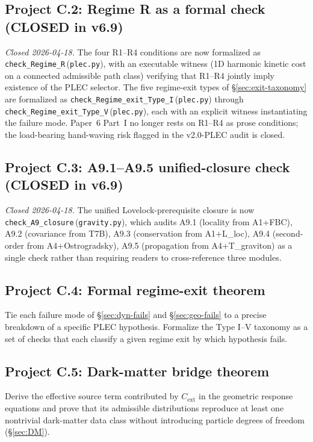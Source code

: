 \documentclass[11pt]{article}
\newcommand{\coderef}[2]{\texttt{#1}\,(\texttt{#2})}
\begin{document}
\subsection*{Project C.2: Regime R as a formal check (CLOSED in v6.9)}\label{sec:open-RegimeR}
\emph{Closed 2026-04-18.} The four R1--R4 conditions are now formalized as
\coderef{check\_Regime\_R}{plec.py}, with an executable witness (1D harmonic
kinetic cost on a connected admissible path class) verifying that R1--R4
jointly imply existence of the PLEC selector. The five regime-exit types
of \S\ref{sec:exit-taxonomy} are formalized as
\coderef{check\_Regime\_exit\_Type\_I}{plec.py} through
\coderef{check\_Regime\_exit\_Type\_V}{plec.py}, each with an explicit
witness instantiating the failure mode. Paper~6 Part~I no longer rests
on R1--R4 as prose conditions; the load-bearing hand-waving risk
flagged in the v2.0-PLEC audit is closed.

\subsection*{Project C.3: A9.1--A9.5 unified-closure check (CLOSED in v6.9)}\label{sec:open-A9}
\emph{Closed 2026-04-18.} The unified Lovelock-prerequisite closure is
now \coderef{check\_A9\_closure}{gravity.py}, which audits A9.1
(locality from A1+FBC), A9.2 (covariance from T7B), A9.3 (conservation
from A1+L\_loc), A9.4 (second-order from A4+Ostrogradsky), A9.5
(propagation from A4+T\_graviton) as a single check rather than
requiring readers to cross-reference three modules.

\subsection*{Project C.4: Formal regime-exit theorem}
Tie each failure mode of \S\ref{sec:dyn-fails} and \S\ref{sec:geo-fails} to a
precise breakdown of a specific PLEC hypothesis. Formalize the Type I--V
taxonomy as a set of checks that each classify a given regime exit by which
hypothesis fails.

\subsection*{Project C.5: Dark-matter bridge theorem}
Derive the effective source term contributed by $C_{\mathrm{ext}}$ in the
geometric response equations and prove that its admissible distributions
reproduce at least one nontrivial dark-matter data class without introducing
particle degrees of freedom (\S\ref{sec:DM}).
\end{document}
